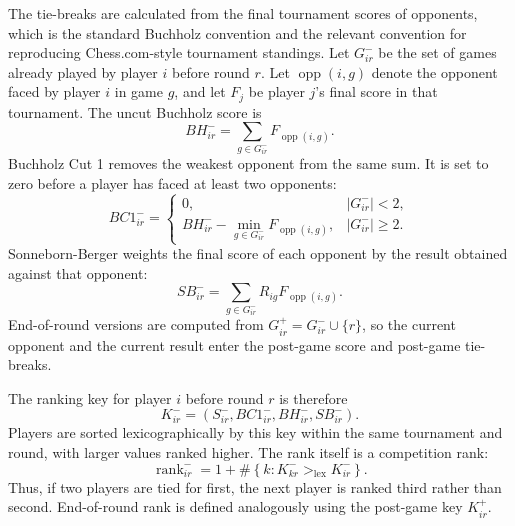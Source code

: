 The tie-breaks are calculated from the final tournament scores of opponents, which is the standard Buchholz convention and the relevant convention for reproducing Chess.com-style tournament standings. Let \(G_{ir}^{-}\) be the set of games already played by player \(i\) before round \(r\). Let \(\operatorname{opp}(i,g)\) denote the opponent faced by player \(i\) in game \(g\), and let \(F_j\) be player \(j\)'s final score in that tournament. The uncut Buchholz score is
\[
BH_{ir}^{-}=\sum_{g\in G_{ir}^{-}}F_{\operatorname{opp}(i,g)} .
\]
Buchholz Cut 1 removes the weakest opponent from the same sum. It is set to zero before a player has faced at least two opponents:
\[
BC1_{ir}^{-}=
\begin{cases}
0, & |G_{ir}^{-}|<2,\\
BH_{ir}^{-}-\min_{g\in G_{ir}^{-}}F_{\operatorname{opp}(i,g)}, & |G_{ir}^{-}|\geq 2.
\end{cases}
\]
Sonneborn-Berger weights the final score of each opponent by the result obtained against that opponent:
\[
SB_{ir}^{-}=\sum_{g\in G_{ir}^{-}} R_{ig}F_{\operatorname{opp}(i,g)} .
\]
End-of-round versions are computed from \(G_{ir}^{+}=G_{ir}^{-}\cup\{r\}\), so the current opponent and the current result enter the post-game score and post-game tie-breaks.

The ranking key for player \(i\) before round \(r\) is therefore
\[
K_{ir}^{-}=\left(S_{ir}^{-},BC1_{ir}^{-},BH_{ir}^{-},SB_{ir}^{-}\right).
\]
Players are sorted lexicographically by this key within the same tournament and round, with larger values ranked higher. The rank itself is a competition rank:
\[
\operatorname{rank}_{ir}^{-}
=1+\#\left\{k:K_{kr}^{-}>_{\operatorname{lex}}K_{ir}^{-}\right\}.
\]
Thus, if two players are tied for first, the next player is ranked third rather than second. End-of-round rank is defined analogously using the post-game key \(K_{ir}^{+}\).

